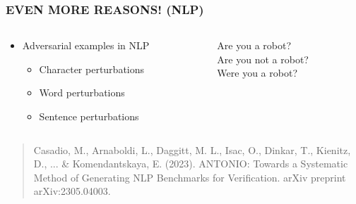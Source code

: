 \documentclass[t,compress,aspectratio=169]{beamer}
\begin{document}
\begin{frame}
\frametitle{EVEN MORE REASONS! (NLP)}

\begin{columns}[c]
    \begin{column}{.5\textwidth}
        \begin{itemize}    \Large

            \item Adversarial examples in NLP
            \begin{itemize}    \Large

                \item Character perturbations
                \item \textcolor{aisecred}{Word perturbations}
                \item Sentence perturbations
            \end{itemize}
        \end{itemize}
    \end{column}
    \begin{column}{.5\textwidth}
    \begin{center}    \Large

        \textcolor{aisecpurple}{Are you a robot?}\\
        \textcolor{aisecpurple}{Are you }\textcolor{aisecred}{not }\textcolor{aisecpurple}{a robot?}\\
        \textcolor{aisecred}{Were }\textcolor{aisecpurple}{you a robot?}
    \end{center}
    \end{column}
\end{columns}
\vfill
	\begin{quote}
		\tiny Casadio, M., {{Arnaboldi, L.}}, Daggitt, M. L., Isac, O., Dinkar, T., Kienitz, D., ... \& Komendantskaya, E. (2023). ANTONIO: Towards a Systematic Method of Generating NLP Benchmarks for Verification. arXiv preprint arXiv:2305.04003.
		
	\end{quote}
\end{frame}
\end{document}
